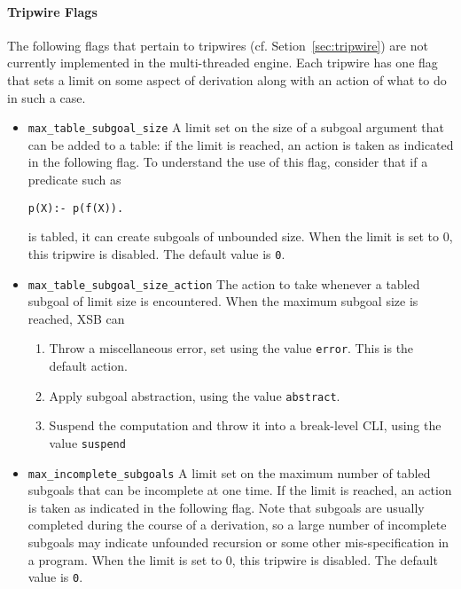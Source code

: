 \begin{description}
\paragraph*{Tripwire Flags}
The following flags that pertain to tripwires
(cf. Setion~\ref{sec:tripwire}) are not currently implemented in the
multi-threaded engine.  Each tripwire has one flag that sets a limit
on some aspect of derivation along with an action of what to do in
such a case.

\begin{itemize}

\item {\tt max\_table\_subgoal\_size} A limit set on the size of a
  subgoal argument that can be added to a table: if the limit is
  reached, an action is taken as indicated in the following flag.  To
  understand the use of this flag, consider that if a predicate such
  as
\begin{verbatim}
p(X):- p(f(X)).
\end{verbatim}
  is tabled, it can create subgoals of unbounded size.  
  When the limit is set to 0, this tripwire is disabled.  The
  default value is {\tt 0}.

\item {\tt max\_table\_subgoal\_size\_action} The action to take
  whenever a tabled subgoal of limit size is encountered.  When the
  maximum subgoal size is reached, XSB can
\begin{enumerate}
\item Throw a miscellaneous error, set using the value {\tt error}.
  This is the default action.
%
\item Apply subgoal abstraction, using the value {\tt abstract}.
%
\item Suspend the computation and throw it into a break-level CLI,
  using the value {\tt suspend}
%
%
\end{enumerate}

\item {\tt max\_incomplete\_subgoals} A limit set on the maximum
  number of tabled subgoals that can be incomplete at one time.  If
  the limit is reached, an action is taken as indicated in the
  following flag.  Note that subgoals are usually completed during the
  course of a derivation, so a large number of incomplete subgoals may
  indicate unfounded recursion or some other mis-specification in a
  program.  When the limit is set to 0, this tripwire is
  disabled.  The default value is {\tt 0}.


\end{itemize}
\end{description}
